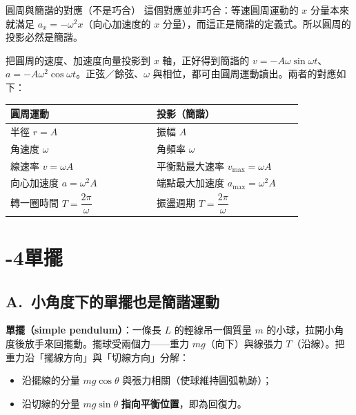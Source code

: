 \documentclass[11pt]{article}
\begin{document}
\begin{補充框}{圓周與簡諧的對應（不是巧合）}
這個對應並非巧合：等速圓周運動的 $x$ 分量本來就滿足 $a_x=-\omega^2 x$（向心加速度的 $x$ 分量），而這正是簡諧的定義式。所以圓周的投影必然是簡諧。

把圓周的速度、加速度向量投影到 $x$ 軸，正好得到簡諧的 $v=-A\omega\sin\omega t$、$a=-A\omega^2\cos\omega t$。正弦／餘弦、$\omega$ 與相位，都可由圓周運動讀出。兩者的對應如下：

\begin{center}
\renewcommand{\arraystretch}{1.25}
\begin{tabular}{p{0.44\linewidth} p{0.44\linewidth}}
\hline
\textbf{圓周運動} & \textbf{投影（簡諧）} \\
\hline
半徑 $r=A$ & 振幅 $A$ \\
角速度 $\omega$ & 角頻率 $\omega$ \\
線速率 $v=\omega A$ & 平衡點最大速率 $v_{\max}=\omega A$ \\
向心加速度 $a=\omega^2 A$ & 端點最大加速度 $a_{\max}=\omega^2 A$ \\
轉一圈時間 $T=\dfrac{2\pi}{\omega}$ & 振盪週期 $T=\dfrac{2\pi}{\omega}$ \\
\hline
\end{tabular}
\end{center}
\end{補充框}

\section*{-4\quad 單擺}

\subsection*{\sffamily A.\ 小角度下的單擺也是簡諧運動}

\textbf{單擺（simple pendulum）}：一條長 $L$ 的輕線吊一個質量 $m$ 的小球，拉開小角度後放手來回擺動。擺球受兩個力——重力 $mg$（向下）與線張力 $T$（沿線）。把重力沿「擺線方向」與「切線方向」分解：


\begin{itemize}\setlength{\itemsep}{1pt}
\item 沿擺線的分量 $mg\cos\theta$ 與張力相關（使球維持圓弧軌跡）；
\item 沿切線的分量 $mg\sin\theta$ \textbf{指向平衡位置}，即為回復力。
\end{itemize}
\end{document}
